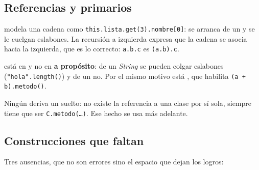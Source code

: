 \subsection{Referencias y primarios}

\begin{producciones}
\end{producciones}

 modela una cadena como \texttt{this.lista.get(3).nombre[0]}: se arranca de un
 y se le cuelgan eslabones. La recursión a izquierda expresa que la cadena se asocia
hacia la izquierda, que es lo correcto: \texttt{a.b.c} es \texttt{(a.b).c}.

 está en  y no en  \textbf{a propósito}: de un
\emph{String} se pueden colgar eslabones (\texttt{"hola".length()}) y de un  no.
Por el mismo motivo está , que habilita \texttt{(a + b).metodo()}.

Ningún  deriva un  suelto: no existe la referencia a una clase por sí
sola, siempre tiene que ser \texttt{C.metodo(\dots)}. Ese hecho se usa más adelante.

\subsection{Construcciones que faltan}

Tres ausencias, que no son errores sino el espacio que dejan los logros:

